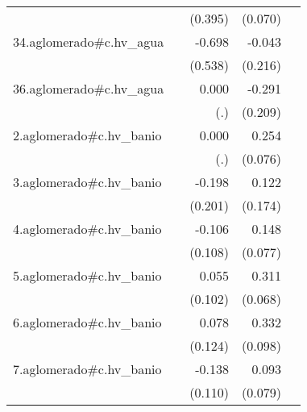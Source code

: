{\begin{longtable}{l*{4}{D{.}{.}{-1}}}
            &                     &     (0.395)         &     (0.070)         &                     \\
\addlinespace
34.aglomerado#c.hv\_agua&                     &      -0.698         &      -0.043         &                     \\
            &                     &     (0.538)         &     (0.216)         &                     \\
\addlinespace
36.aglomerado#c.hv\_agua&                     &       0.000         &      -0.291         &                     \\
            &                     &         (.)         &     (0.209)         &                     \\
\addlinespace
2.aglomerado#c.hv\_banio&                     &       0.000         &       0.254\sym{***}&                     \\
            &                     &         (.)         &     (0.076)         &                     \\
\addlinespace
3.aglomerado#c.hv\_banio&                     &      -0.198         &       0.122         &                     \\
            &                     &     (0.201)         &     (0.174)         &                     \\
\addlinespace
4.aglomerado#c.hv\_banio&                     &      -0.106         &       0.148         &                     \\
            &                     &     (0.108)         &     (0.077)         &                     \\
\addlinespace
5.aglomerado#c.hv\_banio&                     &       0.055         &       0.311\sym{***}&                     \\
            &                     &     (0.102)         &     (0.068)         &                     \\
\addlinespace
6.aglomerado#c.hv\_banio&                     &       0.078         &       0.332\sym{***}&                     \\
            &                     &     (0.124)         &     (0.098)         &                     \\
\addlinespace
7.aglomerado#c.hv\_banio&                     &      -0.138         &       0.093         &                     \\
            &                     &     (0.110)         &     (0.079)         &                     \\

\end{longtable}}
